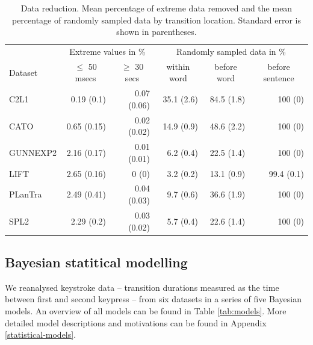 \documentclass[
  english,
  man,floatsintext]{apa7}
\begin{document}
\begin{table}[bp!]

\begin{center}
\begin{threeparttable}

\caption{\label{tab:datareduction}Data reduction. Mean percentage of extreme data removed and the mean percentage of randomly sampled data by transition location. Standard error is shown in parentheses.}

\begin{tabular}{lrrrrr}
\toprule
 \multicolumn{1}{c}{ } & \multicolumn{2}{c}{Extreme values in \%} & \multicolumn{3}{c}{Randomly sampled data in \%} \\
\cmidrule(r){1-1} \cmidrule(r){2-3} \cmidrule(r){4-6}
Dataset & \multicolumn{1}{c}{$\le$ 50 msecs} & \multicolumn{1}{c}{$\ge$ 30 secs} & \multicolumn{1}{c}{within word} & \multicolumn{1}{c}{before word} & \multicolumn{1}{c}{before sentence}\\
\midrule
C2L1 & 0.19 (0.1) & 0.07 (0.06) & 35.1 (2.6) & 84.5 (1.8) & 100 (0)\\
CATO & 0.65 (0.15) & 0.02 (0.02) & 14.9 (0.9) & 48.6 (2.2) & 100 (0)\\
GUNNEXP2 & 2.16 (0.17) & 0.01 (0.01) & 6.2 (0.4) & 22.5 (1.4) & 100 (0)\\
LIFT & 2.65 (0.16) & 0 (0) & 3.2 (0.2) & 13.1 (0.9) & 99.4 (0.1)\\
PLanTra & 2.49 (0.41) & 0.04 (0.03) & 9.7 (0.6) & 36.6 (1.9) & 100 (0)\\
SPL2 & 2.29 (0.2) & 0.03 (0.02) & 5.7 (0.4) & 22.6 (1.4) & 100 (0)\\
\bottomrule
\end{tabular}

\end{threeparttable}
\end{center}

\end{table}

\hypertarget{bayesian-statitical-modelling}{%
\subsection{Bayesian statitical modelling}\label{bayesian-statitical-modelling}}

We reanalysed keystroke data -- transition durations measured as the time between first and second keypress -- from six datasets in a series of five Bayesian models. An overview of all models can be found in Table \ref{tab:models}. More detailed model descriptions and motivations can be found in Appendix \ref{statistical-models}.
\end{document}
